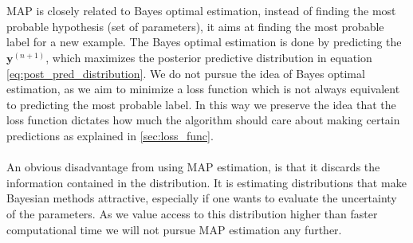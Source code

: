 \\
\\
MAP is closely related to Bayes optimal estimation, instead of finding the most probable hypothesis (set of parameters), it aims at finding the most probable label for a new example. The Bayes optimal estimation is done by predicting the $\boldsymbol{y}^{(n+1)}$, which maximizes the posterior predictive distribution in equation \ref{eq:post_pred_distribution}. We do not pursue the idea of Bayes optimal estimation, as we aim to minimize a loss function which is not always equivalent to predicting the most probable label. In this way we preserve the idea that the loss function dictates how much the algorithm should care about making certain predictions as explained in \ref{sec:loss_func}.
\\
\\
An obvious disadvantage from using MAP estimation, is that it discards the information contained in the distribution. It is estimating distributions that make Bayesian methods attractive, especially if one wants to evaluate the uncertainty of the parameters. As we value access to this distribution higher than faster computational time we will not pursue MAP estimation any further.

